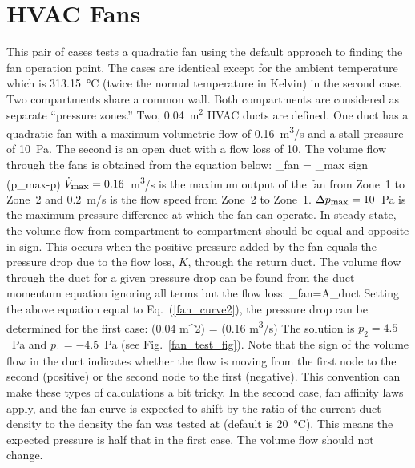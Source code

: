 \documentclass[11pt]{book}
\begin{document}
\section{HVAC Fans}
\label{fan_test}

This pair of cases tests a quadratic fan using the default approach to finding the fan operation point. The cases are identical except for the ambient temperature which is  \SI{313.15}{\degreeCelsius} (twice the normal temperature in Kelvin) in the second case. Two compartments share a common wall. Both compartments are considered as separate ``pressure zones.'' Two, 0.04~m$^2$ HVAC ducts are defined.  One duct has a quadratic fan with a maximum volumetric flow of 0.16~\unit{m^3/s} and a stall pressure of 10~Pa. The second is an open duct with a flow loss of 10. The volume flow through the fans is obtained from the equation below:
\be
   _{\hbox{\footnotesize fan}} = _{\hbox{\footnotesize max}} \; \hbox{sign} (\Delta p_{\hbox{\footnotesize max}}-\Delta p)   \label{fan_curve2}
\ee
$\dot{V}_{\hbox{\footnotesize max}}=0.16$~\unit{m^3/s} is the maximum output of the fan from Zone~1 to Zone~2 and 0.2~m/s is the flow speed from Zone~2 to Zone~1. $\Delta p_{\hbox{\footnotesize max}}=10$~Pa is the maximum pressure difference at which the fan can operate. In steady state, the volume flow from compartment to compartment should be equal and opposite in sign. This occurs when the positive pressure added by the fan equals the pressure drop due to the flow loss, $K$, through the return duct.  The volume flow through the duct for a given pressure drop can be found from the duct momentum equation ignoring all terms but the flow loss:
\be
   _{\hbox{\footnotesize fan}}=A_{\hbox{\footnotesize duct}} 
\ee
Setting the above equation equal to Eq.~(\ref{fan_curve2}), the pressure drop can be determined for the first case:
\be
    (0.04 \; \hbox{m}^2) = (0.16 \; \hbox{\unit{m^3/s}})  \; 
\ee
The solution is $p_2=4.5$~Pa and $p_1=-4.5$~Pa (see Fig.~\ref{fan_test_fig}). Note that the sign of the volume flow in the duct indicates whether the flow is moving from the first node to the second (positive) or the second node to the first (negative). This convention can make these types of calculations a bit tricky. In the second case, fan affinity laws apply, and the fan curve is expected to shift by the ratio of the current duct density to the density the fan was tested at (default is  \SI{20}{\degreeCelsius}). This means the expected pressure is half that in the first case. The volume flow should not change. 
\end{document}
